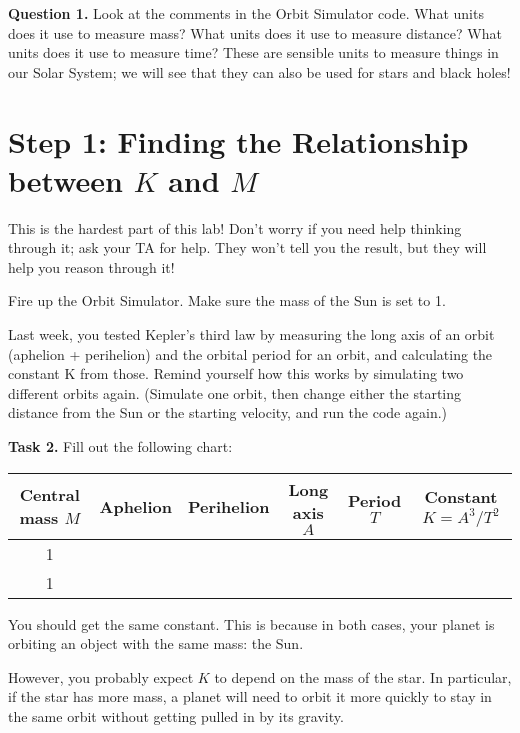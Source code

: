 \documentclass[11pt]{article}
\begin{document}
\textbf{Question 1.} Look at the comments in the Orbit Simulator code. What units does it use to measure mass? What units does it use to measure distance? What units does it use to measure time? These are sensible units to measure things in our Solar System; we will see that they can also be used for stars and black holes!

\vspace{1in}

\section{Step 1: Finding the Relationship between $K$ and $M$}

This is the hardest part of this lab! Don’t worry if you need help thinking through it; ask your TA for help. They won't tell you the result, but they will help you reason through it!

Fire up the Orbit Simulator. Make sure the mass of the Sun is set to 1.

Last week, you tested Kepler’s third law by measuring the long axis of an orbit (aphelion + perihelion) and the orbital period for an orbit, and calculating the constant K from those. Remind yourself how this works by simulating two different orbits again. (Simulate one orbit, then change either the starting distance from the Sun or the starting velocity, and run the code again.) 

\bigskip

{\bf Task 2.} Fill out the following chart:

\begin{center}
	\large
\begin{tabular}{|c|c|c|c|c|c|}
	\hline
	Central mass $M$ & Aphelion & Perihelion & Long axis $A$ & Period $T$ & Constant $K = A^3 / T^2$ \\ \hline
	1 & & & & &  \\ \hline
	1 & & & & &  \\ \hline
	
\end{tabular}

\end{center}

You should get the same constant. This is because in both cases, your planet is orbiting an object with the same mass: the Sun.

However, you probably expect $K$ to depend on the mass of the star. In particular, if the star has more mass, a planet will need to orbit it more quickly to stay in the same orbit without getting pulled in by its gravity.
\end{document}
